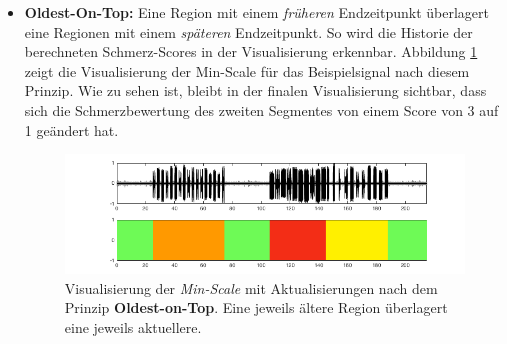 \begin{itemize}
\item \textbf{Oldest-On-Top: } Eine Region mit einem \emph{früheren} Endzeitpunkt überlagert eine Regionen mit einem \emph{späteren} Endzeitpunkt. So wird die Historie der berechneten Schmerz-Scores in der Visualisierung erkennbar. Abbildung \ref{fig:viz_act_under} zeigt die Visualisierung der Min-Scale für das Beispielsignal nach diesem Prinzip. Wie zu sehen ist, bleibt in der finalen Visualisierung sichtbar, dass sich die Schmerzbewertung des zweiten Segmentes von einem Score von 3 auf 1 geändert hat.

\begin{figure}[h]
	\centering
	\includegraphics[width=1\textwidth]{bilder/viz_act_under_02.png}
	\caption[Visualisierung der bei Aktualisierungen mit Priorisierung der vorangegangenen Schmerzbewertung]{Visualisierung der \emph{Min-Scale} mit Aktualisierungen nach dem Prinzip \textbf{Oldest-on-Top}. Eine jeweils \glqq ältere\grqq{} Region überlagert eine jeweils \glqq aktuellere\grqq{}.}
	\label{fig:viz_act_under}
\end{figure}
 
\end{itemize}
